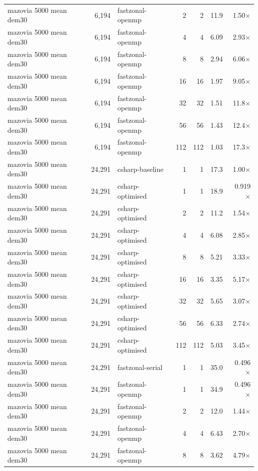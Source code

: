 \begin{tabular}{lrlrrrr}
mazovia 5000 mean dem30 & 6,194 & fastzonal-openmp & 2 & 2 & 11.9 & 1.50$\times$ \\
mazovia 5000 mean dem30 & 6,194 & fastzonal-openmp & 4 & 4 & 6.09 & 2.93$\times$ \\
mazovia 5000 mean dem30 & 6,194 & fastzonal-openmp & 8 & 8 & 2.94 & 6.06$\times$ \\
mazovia 5000 mean dem30 & 6,194 & fastzonal-openmp & 16 & 16 & 1.97 & 9.05$\times$ \\
mazovia 5000 mean dem30 & 6,194 & fastzonal-openmp & 32 & 32 & 1.51 & 11.8$\times$ \\
mazovia 5000 mean dem30 & 6,194 & fastzonal-openmp & 56 & 56 & 1.43 & 12.4$\times$ \\
mazovia 5000 mean dem30 & 6,194 & fastzonal-openmp & 112 & 112 & 1.03 & 17.3$\times$ \\
mazovia 5000 mean dem30 & 24,291 & csharp-baseline & 1 & 1 & 17.3 & 1.00$\times$ \\
mazovia 5000 mean dem30 & 24,291 & csharp-optimised & 1 & 1 & 18.9 & 0.919$\times$ \\
mazovia 5000 mean dem30 & 24,291 & csharp-optimised & 2 & 2 & 11.2 & 1.54$\times$ \\
mazovia 5000 mean dem30 & 24,291 & csharp-optimised & 4 & 4 & 6.08 & 2.85$\times$ \\
mazovia 5000 mean dem30 & 24,291 & csharp-optimised & 8 & 8 & 5.21 & 3.33$\times$ \\
mazovia 5000 mean dem30 & 24,291 & csharp-optimised & 16 & 16 & 3.35 & 5.17$\times$ \\
mazovia 5000 mean dem30 & 24,291 & csharp-optimised & 32 & 32 & 5.65 & 3.07$\times$ \\
mazovia 5000 mean dem30 & 24,291 & csharp-optimised & 56 & 56 & 6.33 & 2.74$\times$ \\
mazovia 5000 mean dem30 & 24,291 & csharp-optimised & 112 & 112 & 5.03 & 3.45$\times$ \\
mazovia 5000 mean dem30 & 24,291 & fastzonal-serial & 1 & 1 & 35.0 & 0.496$\times$ \\
mazovia 5000 mean dem30 & 24,291 & fastzonal-openmp & 1 & 1 & 34.9 & 0.496$\times$ \\
mazovia 5000 mean dem30 & 24,291 & fastzonal-openmp & 2 & 2 & 12.0 & 1.44$\times$ \\
mazovia 5000 mean dem30 & 24,291 & fastzonal-openmp & 4 & 4 & 6.43 & 2.70$\times$ \\
mazovia 5000 mean dem30 & 24,291 & fastzonal-openmp & 8 & 8 & 3.62 & 4.79$\times$ \\

\end{tabular}
